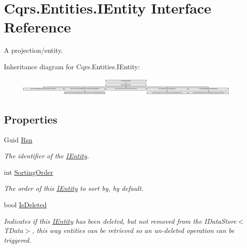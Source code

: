 \hypertarget{interfaceCqrs_1_1Entities_1_1IEntity}{}\section{Cqrs.\+Entities.\+I\+Entity Interface Reference}
\label{interfaceCqrs_1_1Entities_1_1IEntity}


A projection/entity.  


Inheritance diagram for Cqrs.\+Entities.\+I\+Entity\+:\begin{figure}[H]
\begin{center}
\leavevmode
\includegraphics[height=0.961373cm]{interfaceCqrs_1_1Entities_1_1IEntity}
\end{center}
\end{figure}
\subsection*{Properties}
\begin{DoxyCompactItemize}
\item 
Guid \hyperlink{interfaceCqrs_1_1Entities_1_1IEntity_af2bfc288bc574712d7f00af608789f8d_af2bfc288bc574712d7f00af608789f8d}{Rsn}
\begin{DoxyCompactList}\small\item\em The identifier of the \hyperlink{interfaceCqrs_1_1Entities_1_1IEntity}{I\+Entity}. \end{DoxyCompactList}\item 
int \hyperlink{interfaceCqrs_1_1Entities_1_1IEntity_a3de43465f8acc41ff10fd69a8c060225_a3de43465f8acc41ff10fd69a8c060225}{Sorting\+Order}
\begin{DoxyCompactList}\small\item\em The order of this \hyperlink{interfaceCqrs_1_1Entities_1_1IEntity}{I\+Entity} to sort by, by default. \end{DoxyCompactList}\item 
bool \hyperlink{interfaceCqrs_1_1Entities_1_1IEntity_a00ec967f1f8e6c32ae7d4ecc9d3a8e08_a00ec967f1f8e6c32ae7d4ecc9d3a8e08}{Is\+Deleted}
\begin{DoxyCompactList}\small\item\em Indicates if this \hyperlink{interfaceCqrs_1_1Entities_1_1IEntity}{I\+Entity} has been deleted, but not removed from the I\+Data\+Store$<$\+T\+Data$>$, this way entities can be retrieved so an un-\/deleted operation can be triggered. \end{DoxyCompactList}\end{DoxyCompactItemize}


